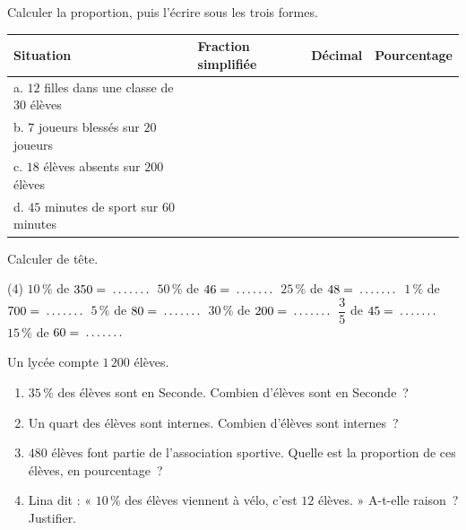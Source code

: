 \documentclass[a4paper,11pt,fleqn]{article}
\renewcommand{\arraystretch}{1.5}
\newcommand{\pt}[1][1.6cm]{\makebox[#1]{\dotfill}}
\newcommand{\ligne}{\par\smallskip\makebox[\linewidth]{\dotfill}\par}
\begin{document}
\begin{EXO}{}{}
Calculer la proportion, puis l'écrire sous les trois formes.

\begin{center}
\renewcommand{\arraystretch}{2}
\begin{tabular}{|p{7.2cm}|C{2.6cm}|C{2.2cm}|C{2.6cm}|}
	\hline
	\textbf{Situation} & \textbf{Fraction simplifiée} & \textbf{Décimal} & \textbf{Pourcentage} \\ \hline
	a. $12$ filles dans une classe de $30$ élèves & & & \\ \hline
	b. $7$ joueurs blessés sur $20$ joueurs & & & \\ \hline
	c. $18$ élèves absents sur $200$ élèves & & & \\ \hline
	d. $45$ minutes de sport sur $60$ minutes & & & \\ \hline
\end{tabular}
\end{center}
\end{EXO}

\begin{EXO}{}{}
Calculer de tête.

\begin{tasks}[label=\textbf{\alph*.}, item-indent=2em, after-item-skip=0.7em](4)
	\task $10\,\%$ de $350 = \pt[1.2cm]$
	\task $50\,\%$ de $46 = \pt[1.2cm]$
	\task $25\,\%$ de $48 = \pt[1.2cm]$
	\task $1\,\%$ de $700 = \pt[1.2cm]$
	\task $5\,\%$ de $80 = \pt[1.2cm]$
	\task $30\,\%$ de $200 = \pt[1.2cm]$
	\task $\dfrac{3}{5}$ de $45 = \pt[1.2cm]$
	\task $15\,\%$ de $60 = \pt[1.2cm]$
\end{tasks}
\end{EXO}

\begin{EXO}{}{}
Un lycée compte $1\,200$ élèves.
\begin{enumerate}[itemsep=0.3em]
	\item $35\,\%$ des élèves sont en Seconde. Combien d'élèves sont en Seconde~?
	\ligne\ligne
	\item Un quart des élèves sont internes. Combien d'élèves sont internes~?
	\ligne\ligne
	\item $480$ élèves font partie de l'association sportive. Quelle est la proportion de ces élèves, en pourcentage~?
	\ligne\ligne
	\item Lina dit : « $10\,\%$ des élèves viennent à vélo, c'est $12$ élèves. » A-t-elle raison~? Justifier.
	\ligne\ligne
\end{enumerate}
\end{EXO}
\end{document}
